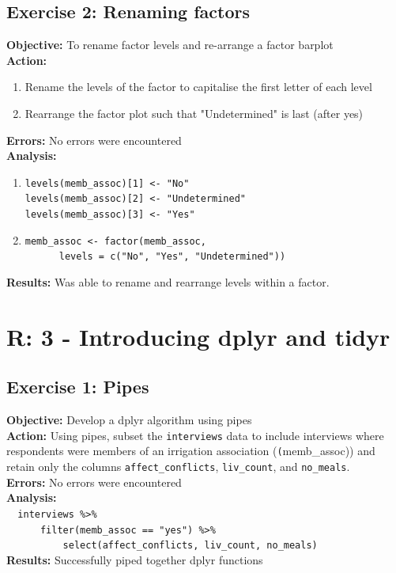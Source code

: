 \documentclass{article}
\begin{document}
\subsection{Exercise 2: Renaming factors}
\textbf{Objective:} To rename factor levels and re-arrange a factor barplot\\
\textbf{Action:}
\begin{enumerate}
    \item Rename the levels of the factor to capitalise the first letter of each level
    \item Rearrange the factor plot such that "Undetermined" is last (after yes)
\end{enumerate}
\textbf{Errors:} No errors were encountered\\
\textbf{Analysis:}
\begin{enumerate}
    \item 
    \verb|levels(memb_assoc)[1] <- "No"|\\
    \verb|levels(memb_assoc)[2] <- "Undetermined"|\\
    \verb|levels(memb_assoc)[3] <- "Yes"|
    \item \verb|memb_assoc <- factor(memb_assoc, |\\
    \verb|      levels = c("No", "Yes", "Undetermined"))|
\end{enumerate}
\textbf{Results:} Was able to rename and rearrange levels within a factor.

\section{R: 3 - Introducing dplyr and tidyr}

\subsection{Exercise 1: Pipes}
\textbf{Objective:} Develop a dplyr algorithm using pipes\\
\textbf{Action:} Using pipes, subset the \texttt{interviews} data to include interviews where respondents were members of an irrigation association (\texttt(memb\_assoc)) and retain only the columns \texttt{affect\_conflicts}, \texttt{liv\_count}, and \texttt{no\_meals}. \\
\textbf{Errors:} No errors were encountered\\
\textbf{Analysis:}\\
    \verb|  interviews %>%|\\
    \verb|      filter(memb_assoc == "yes") %>%|\\
    \verb|          select(affect_conflicts, liv_count, no_meals)|\\
\textbf{Results:} Successfully piped together dplyr functions
\end{document}
